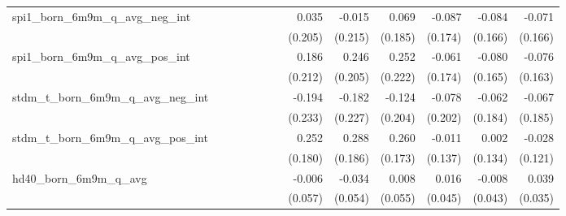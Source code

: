 \begin{tabular}{lrrrrrrrrrrrr}
spi1\_born\_6m9m\_q\_avg\_neg\_int          &              &              &              &              &              &              &        0.035 &       -0.015 &        0.069 &       -0.087 &       -0.084 &       -0.071 \\ 
                                            &              &              &              &              &              &              &      (0.205) &      (0.215) &      (0.185) &      (0.174) &      (0.166) &      (0.166) \\ 
spi1\_born\_6m9m\_q\_avg\_pos\_int          &              &              &              &              &              &              &        0.186 &        0.246 &        0.252 &       -0.061 &       -0.080 &       -0.076 \\ 
                                            &              &              &              &              &              &              &      (0.212) &      (0.205) &      (0.222) &      (0.174) &      (0.165) &      (0.163) \\ 
stdm\_t\_born\_6m9m\_q\_avg\_neg\_int       &              &              &              &              &              &              &       -0.194 &       -0.182 &       -0.124 &       -0.078 &       -0.062 &       -0.067 \\ 
                                            &              &              &              &              &              &              &      (0.233) &      (0.227) &      (0.204) &      (0.202) &      (0.184) &      (0.185) \\ 
stdm\_t\_born\_6m9m\_q\_avg\_pos\_int       &              &              &              &              &              &              &        0.252 &        0.288 &        0.260 &       -0.011 &        0.002 &       -0.028 \\ 
                                            &              &              &              &              &              &              &      (0.180) &      (0.186) &      (0.173) &      (0.137) &      (0.134) &      (0.121) \\ 
hd40\_born\_6m9m\_q\_avg                    &              &              &              &              &              &              &       -0.006 &       -0.034 &        0.008 &        0.016 &       -0.008 &        0.039 \\ 
                                            &              &              &              &              &              &              &      (0.057) &      (0.054) &      (0.055) &      (0.045) &      (0.043) &      (0.035) \\ 

\end{tabular}

